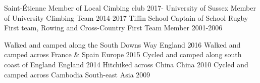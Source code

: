 \begin{cvhonors}
  \cvhonor
  {Saint-\'Etienne}
  {Member of Local Cimbing club}
  {}
  {2017-}
  \cvhonor
    {University of Sussex}
    {Member of University Climbing Team}
    {}
    {2014-2017}
  \cvhonor
    {Tiffin School}
    {Captain of School Rugby First team, Rowing and Cross-Country First Team Member}
    {}
    {2001-2006}
\end{cvhonors}

\begin{cvhonors}
  \cvhonor
    {Walked and camped along the South Downs Way}
    {}
    {England}
    {2016}
  \cvhonor
    {Walked and camped across France \& Spain}
    {}
    {Europe}
    {2015}
  \cvhonor
	{Cycled and camped along south coast of England}
	{}
	{England}
	{2014}
 \cvhonor
    {Hitchiked across China}
    {}
    {China}
    {2010}
 \cvhonor
    {Cycled and camped across Cambodia}
    {}
    {South-east Asia}
    {2009}
\end{cvhonors}
